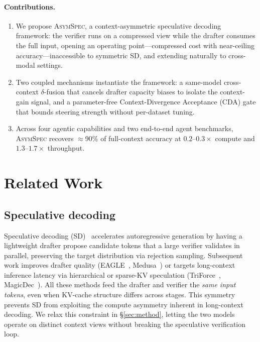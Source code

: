 \documentclass[11pt]{article}
\theoremstyle{plain}
\theoremstyle{definition}
\begin{document}
\paragraph{Contributions.}
\vspace{-0.2em}
\begin{enumerate}\itemsep0pt
\vspace{-0.2em}
\item We propose \textsc{AsymSpec}, a context-asymmetric speculative
  decoding framework: the verifier runs on a compressed view while the
  drafter consumes the full input, opening an operating point---compressed
  cost with near-ceiling accuracy---inaccessible to symmetric SD, and
  extending naturally to cross-modal settings.
\vspace{-0.2em}
\item Two coupled mechanisms instantiate the framework: a same-model
  cross-context $\delta$-fusion that cancels drafter capacity biases to
  isolate the context-gain signal, and a parameter-free Context-Divergence
  Acceptance (CDA) gate that bounds steering strength without per-dataset
  tuning.
\vspace{-0.2em}
\item Across four agentic capabilities and two end-to-end agent benchmarks,
  \textsc{AsymSpec} recovers $\approx$90\% of full-context accuracy at
  $0.2$--$0.3\times$ compute and $1.3$--$1.7\times$ throughput.
\end{enumerate}

\section{Related Work}
\label{sec:related}

\subsection{Speculative decoding}
Speculative decoding (SD)~\citep{leviathan2023fast,chen2023accelerating} accelerates autoregressive generation by having a lightweight drafter propose candidate tokens that a large verifier validates in parallel, preserving the target distribution via rejection sampling. Subsequent work improves drafter quality (EAGLE~\citep{li2024eagle,li2024eagle2,li2025eagle3}, Medusa~\citep{cai2024medusa}) or targets long-context inference latency via hierarchical or sparse-KV speculation (TriForce~\citep{triforce2024}, MagicDec~\citep{magicdec2025}). All these methods feed the drafter and verifier the \emph{same input tokens}, even when KV-cache structure differs across stages. This symmetry prevents SD from exploiting the compute asymmetry inherent in long-context decoding. We relax this constraint in \S\ref{sec:method}, letting the two models operate on distinct context views without breaking the speculative verification loop.
\end{document}
